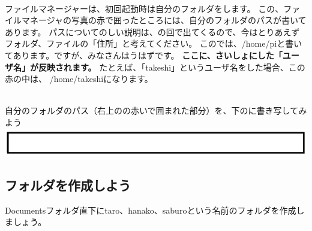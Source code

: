 \documentclass[a4paper,12pt]{jarticle}
\begin{document}
\\ファイルマネージャーは、初回起動時は自分のフォルダをします。
この、ファイルマネージャの写真の赤で囲ったところには、自分のフォルダのパスが書いてあります。
パスについてのしい説明は、の回で出てくるので、今はとりあえずフォルダ、ファイルの「住所」と考えてください。
このでは、/home/piと書いてあります。ですが、みなさんはうはずです。
\textbf{\color{red}ここに、さいしょにした「ユーザ名」が反映されます。}
たとえば、「takeshi」というユーザ名をした場合、この赤の中は、
/home/takeshiになります。
\vspace{20pt}

\theQuestion\\
自分のフォルダのパス（右上のの赤いで囲まれた部分）を、下のに書き写してみよう
\includegraphics[width=17cm]{textbook-img1021.png}
\clearpage

\subsection{\theExercise フォルダを作成しよう}
Documentsフォルダ直下にtaro、hanako、saburoという名前のフォルダを作成しましょう。\\
\end{document}
